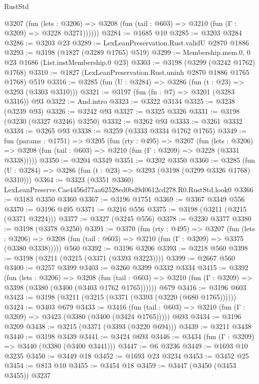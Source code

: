 \begin{lexlean}{RustStd}
\begin{coremodule}
        @3207
          (fun (lets : @3206) =>
          @3208 (fun (tail : @603) => @3210 (fun (Γ : @3209) => @3228 @3271))))))
@3284 := @1685 @10
@3285 := @3203 @3284
@3286 := @3203 @23
@3289 := LexLeanPreservation.Rust.validU @2870 @1886
@3293 := @3198 (@1827 (@3289 @1765) @519)
@3299 := Membership.mem.{0, 0} @23 @1686 (List.instMembership.{0} @23)
@3303 := @3198 (@3299 (@3242 @1762) @1768)
@3310 := @1827 (LexLeanPreservation.Rust.uninh @2870 @1886 @1765 @1768) @519
@3316 := @3285 (fun (U : @3284) => @3286 (fun (t : @23) => @3293 (@3303 @3310)))
@3321 := @3197 (fun (fn : @7) => @3201 (@3283 @3316)) @93
@3322 := And.intro
@3323 := @3322 @3134
@3325 := @3238 (@3239 @93)
@3326 := @3242 @93
@3327 := @3325 @3326
@3331 := @3198 (@3230 (@3327 @3246) @3250)
@3332 := @3262 @93
@3333 := @3261 @3332
@3334 := @3265 @93
@3338 := @3259 (@3333 @3334 @1762 @1765)
@3349 := fun (params : @1751) =>
  @3205
    (fun (rty : @495) =>
    @3207
      (fun (lets : @3206) =>
      @3208 (fun (tail : @603) => @3210 (fun (Γ : @3209) => @3228 (@3331 @3338)))))
@3350 := @3204 @3349
@3351 := @3202 @3350
@3360 := @3285 (fun (U : @3284) => @3286 (fun (t : @23) => @3293 (@3198 (@3299 @3326 @1768) @3310)))
@3364 := @3323 (@3351 @3360) LexLeanPreserve.Cae4456d77aa62528ed0bd9d0612cd278.R0.RustStd.look0
@3366 := @3183 @3350 @3360
@3367 := @3196 @1751
@3369 := @3367 @3349 @556
@3370 := @3196 @495
@3371 := @3216 @556
@3375 := @3198 (@3211 (@3215 (@3371 @3224)))
@3377 := @3327 (@3245 @556)
@3378 := @3230 @3377
@3380 := @3198 (@3378 @3250)
@3391 := @3370
    (fun (rty : @495) =>
    @3207
      (fun (lets : @3206) =>
      @3208 (fun (tail : @603) => @3210 (fun (Γ : @3209) => @3375 (@3380 @3338)))))
    @560
@3392 := @3196 @3206
@3393 := @3218 @560
@3398 := @3198 (@3211 (@3215 (@3371 (@3393 @3223))))
@3399 := @2667 @560
@3400 := @3257 @3399
@3403 := @3260 @3399 @3332 @3334
@3415 := @3392
    (fun (lets : @3206) =>
    @3208
      (fun (tail : @603) => @3210 (fun (Γ : @3209) => @3398 (@3380 (@3400 (@3403 @1762 @1765))))))
    @679
@3416 := @3196 @603
@3423 := @3198 (@3211 (@3215 (@3371 (@3393 (@3220 (@680 @1765))))))
@3424 := @3403 @679
@3433 := @3416
    (fun (tail : @603) => @3210 (fun (Γ : @3209) => @3423 (@3380 (@3400 (@3424 @1765)))))
    @693
@3434 := @3196 @3209
@3438 := @3215 (@3371 (@3393 (@3220 @694)))
@3439 := @3211 @3438
@3440 := @3198 @3439
@3441 := @3424 @693
@3446 := @3434 (fun (Γ : @3209) => @3440 (@3380 (@3400 @3441)))
@3447 := @6 @3236
@3449 := @1693 @10 @3235
@3450 := @3449 @18
@3452 := @1693 @23 @3234
@3453 := @3452 @25
@3454 := @813 @10
@3455 := @3454 @18
@3459 := @3447 (@3450 (@3453 @3455)) @3237

\end{coremodule}
\end{lexlean}
